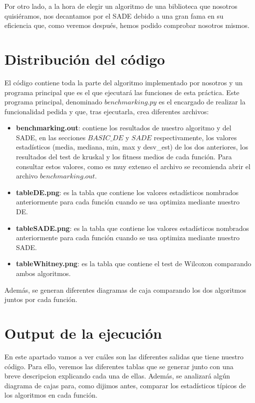 \documentclass[11pt, a4paper, titlepage]{article}
\begin{document}
\vspace{5mm}

Por otro lado, a la hora de elegir un algoritmo de una biblioteca que nosotros quisiéramos, nos decantamos por el SADE debido a una gran fama en su eficiencia que, como veremos después, hemos podido comprobar nosotros mismos.

\newpage

\section{Distribución del código}
El código contiene toda la parte del algoritmo implementado por nosotros y un programa principal que es el que ejecutará las funciones de esta práctica. Este programa principal, denominado $benchmarking.py$ es el encargado de realizar la funcionalidad pedida y que, tras ejecutarla, crea diferentes archivos:

\begin{itemize}
\item \textbf{benchmarking.out}: contiene los resultados de nuestro algoritmo y del SADE, en las secciones $BASIC\_DE$ y $SADE$ respectivamente, los valores estadísticos (media, mediana, min, max y desv\_est) de los dos anteriores, los resultados del test de kruskal y los fitness medios de cada función. Para consultar estos valores, como es muy extenso el archivo se recomienda abrir el archivo $benchmarking.out$.
\item \textbf{tableDE.png}: es la tabla que contiene los valores estadísticos nombrados anteriormente para cada función cuando se usa optimiza mediante nuestro DE.
\item \textbf{tableSADE.png}: es la tabla que contiene los valores estadísticos nombrados anteriormente para cada función cuando se usa optimiza mediante nuestro SADE.
\item \textbf{tableWhitney.png}: es la tabla que contiene el test de Wilcoxon comparando ambos algoritmos.
\end{itemize}
Además, se generan diferentes diagramas de caja comparando los dos algoritmos juntos por cada función.

\newpage

\section{Output de la ejecución}
En este apartado vamos a ver cuáles son las diferentes salidas que tiene nuestro código. Para ello, veremos las diferentes tablas que se generar junto con una breve descripcion explicando cada una de ellas. Además, se analizará
algún diagrama de cajas para, como dijimos antes, comparar los estadísticos típicos de los algoritmos en cada función.
\end{document}
